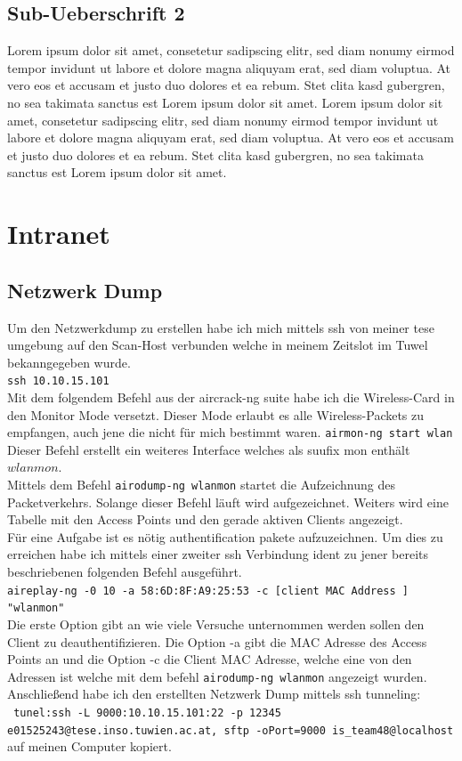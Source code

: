 \documentclass[12pt,a4paper,titlepage,oneside]{scrartcl}
\begin{document}
\subsection{Sub-Ueberschrift 2}
Lorem ipsum dolor sit amet, consetetur sadipscing elitr, sed diam nonumy eirmod tempor invidunt ut labore et dolore magna aliquyam erat, sed diam voluptua. At vero eos et accusam et justo duo dolores et ea rebum. Stet clita kasd gubergren, no sea takimata sanctus est Lorem ipsum dolor sit amet. Lorem ipsum dolor sit amet, consetetur sadipscing elitr, sed diam nonumy eirmod tempor invidunt ut labore et dolore magna aliquyam erat, sed diam voluptua. At vero eos et accusam et justo duo dolores et ea rebum. Stet clita kasd gubergren, no sea takimata sanctus est Lorem ipsum dolor sit amet.

\section{Intranet}

\subsection{Netzwerk Dump}
Um den Netzwerkdump zu erstellen habe ich mich mittels ssh von meiner tese umgebung auf den Scan-Host verbunden welche in meinem Zeitslot im Tuwel bekanngegeben wurde. \\
\lstinline{ssh 10.10.15.101} \\
Mit dem folgendem Befehl aus der aircrack-ng suite habe ich die Wireless-Card in den Monitor Mode versetzt. Dieser Mode erlaubt es alle Wireless-Packets zu empfangen, auch jene die nicht für mich bestimmt waren.
\lstinline{airmon-ng start wlan} \\
Dieser Befehl erstellt ein weiteres Interface welches als suufix mon enthält \( wlanmon \). \\
Mittels dem Befehl \lstinline{airodump-ng wlanmon} startet die Aufzeichnung des Packetverkehrs. Solange dieser Befehl l\"auft wird aufgezeichnet. Weiters wird eine Tabelle mit den Access Points und den gerade aktiven Clients angezeigt. \\
Für eine Aufgabe ist es nötig authentification pakete aufzuzeichnen. Um dies zu erreichen habe ich mittels einer zweiter ssh Verbindung ident zu jener bereits beschriebenen folgenden Befehl ausgeführt. \\
\lstinline{aireplay-ng -0 10 -a 58:6D:8F:A9:25:53 -c [client MAC Address ] "wlanmon"} \\
Die erste Option gibt an wie viele Versuche unternommen werden sollen den Client zu deauthentifizieren. Die Option -a gibt die MAC Adresse des Access Points an und die Option -c die Client MAC Adresse, welche eine von den Adressen ist welche mit dem befehl \lstinline{airodump-ng wlanmon} angezeigt wurden. \\
Anschließend habe ich den erstellten Netzwerk Dump mittels ssh tunneling: \\
\lstinline{ tunel:ssh -L 9000:10.10.15.101:22 -p 12345 e01525243@tese.inso.tuwien.ac.at, sftp -oPort=9000 is_team48@localhost } \\
auf meinen Computer kopiert.
\end{document}
